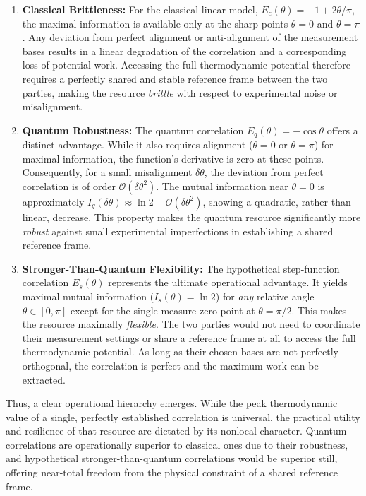 \documentclass[%
  reprint,
  showpacs,
  showkeys,
  pra,
  longbibliography,
  floatfix,
  x11names
]{revtex4-2}
\begin{document}
\begin{enumerate}
    \item \textbf{Classical Brittleness:} For the classical linear model, $E_c(\theta) = -1 + 2\theta/\pi$, the maximal information is available only at the sharp points $\theta=0$ and $\theta=\pi$. Any deviation from perfect alignment or anti-alignment of the measurement bases results in a linear degradation of the correlation and a corresponding loss of potential work. Accessing the full thermodynamic potential therefore requires a perfectly shared and stable reference frame between the two parties, making the resource \emph{brittle} with respect to experimental noise or misalignment.

    \item \textbf{Quantum Robustness:} The quantum correlation $E_q(\theta) = -\cos\theta$ offers a distinct advantage. While it also requires alignment ($\theta=0$ or $\theta=\pi$) for maximal information, the function's derivative is zero at these points. Consequently, for a small misalignment $\delta\theta$, the deviation from perfect correlation is of order $\mathcal{O}(\delta\theta^2)$. The mutual information near $\theta=0$ is approximately $I_q(\delta\theta) \approx \ln 2 - \mathcal{O}(\delta\theta^2)$, showing a quadratic, rather than linear, decrease. This property makes the quantum resource significantly more \emph{robust} against small experimental imperfections in establishing a shared reference frame.

    \item \textbf{Stronger-Than-Quantum Flexibility:} The hypothetical step-function correlation $E_s(\theta)$ represents the ultimate operational advantage. It yields maximal mutual information ($I_s(\theta) = \ln 2$) for \emph{any} relative angle $\theta \in [0, \pi]$ except for the single measure-zero point at $\theta=\pi/2$. This makes the resource maximally \emph{flexible}. The two parties would not need to coordinate their measurement settings or share a reference frame at all to access the full thermodynamic potential. As long as their chosen bases are not perfectly orthogonal, the correlation is perfect and the maximum work can be extracted.
\end{enumerate}

Thus, a clear operational hierarchy emerges. While the peak thermodynamic value of a single, perfectly established correlation is universal, the practical utility and resilience of that resource are dictated by its nonlocal character. Quantum correlations are operationally superior to classical ones due to their robustness, and hypothetical stronger-than-quantum correlations would be superior still, offering near-total freedom from the physical constraint of a shared reference frame.
\end{document}
